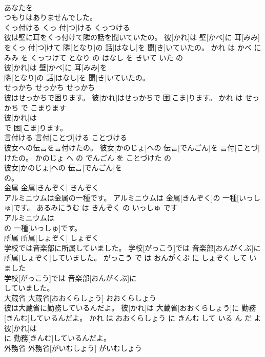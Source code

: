 \documentclass[8pt]{extreport}
\begin{document}
\begin{CJK}{UTF8}{min}
\\	あなたを
\\	つもりはありませんでした。			
\\	くっ付ける	くっ 付[つ]ける	くっつける	
\\	彼は壁に耳をくっ付けて隣の話を聞いていたの。	彼[かれ]は 壁[かべ]に 耳[みみ]をくっ 付[つ]けて 隣[となり]の 話[はなし]を 聞[き]いていたの。	かれ は かべ に みみ を くっつけて となり の はなし を きいて いた の	
\\	彼[かれ]は 壁[かべ]に 耳[みみ]を
\\	隣[となり]の 話[はなし]を 聞[き]いていたの。			
\\	せっかち	せっかち	せっかち	
\\	彼はせっかちで困ります。	彼[かれ]はせっかちで 困[こま]ります。	かれ は せっかち で こまります	
\\	彼[かれ]は
\\	で 困[こま]ります。			
\\	言付ける	言付[ことづ]ける	ことづける	
\\	彼女への伝言を言付けたの。	彼女[かのじょ]への 伝言[でんごん]を 言付[ことづ]けたの。	かのじょ へ の でんごん を ことづけた の	
\\	彼女[かのじょ]への 伝言[でんごん]を
\\	の。			
\\	金属	金属[きんぞく]	きんぞく	
\\	アルミニウムは金属の一種です。	アルミニウムは 金属[きんぞく]の 一種[いっしゅ]です。	あるみにうむ は きんぞく の いっしゅ です	
\\	アルミニウムは
\\	の 一種[いっしゅ]です。			
\\	所属	所属[しょぞく]	しょぞく	
\\	学校では音楽部に所属していました。	学校[がっこう]では 音楽部[おんがくぶ]に 所属[しょぞく]していました。	がっこう で は おんがくぶ に しょぞく して いました	
\\	学校[がっこう]では 音楽部[おんがくぶ]に
\\	していました。			
\\	大蔵省	大蔵省[おおくらしょう]	おおくらしょう	
\\	彼は大蔵省に勤務しているんだよ。	彼[かれ]は 大蔵省[おおくらしょう]に 勤務[きんむ]しているんだよ。	かれ は おおくらしょう に きんむ して いる ん だ よ	
\\	彼[かれ]は
\\	に 勤務[きんむ]しているんだよ。			
\\	外務省	外務省[がいむしょう]	がいむしょう	

\end{CJK}
\end{document}
